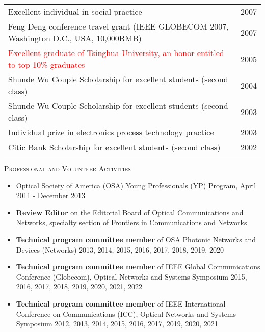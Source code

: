 \documentclass[letterpaper,11pt]{article}
\newcommand{\resheading}[1]{{\noindent\large \colorbox{mygrey}{
\begin{minipage}{1.0\textwidth}{\textsc{#1 \vphantom{p\^{E}}}}\end{minipage}}}}
\begin{document}
\begin{CJK}{UTF8}{gbsn}
\begin{tabular*}{7.08in}{l@{\extracolsep{\fill}}r}
Excellent individual in social practice & 2007\\
Feng Deng conference travel grant (IEEE GLOBECOM 2007, Washington D.C., USA, 10,000RMB) & 2007\\
\textcolor{Red}{Excellent graduate of Tsinghua University, an honor entitled to top 10\% graduates} & 2005\\
Shunde Wu Couple Scholarship for excellent students (second class) & 2004\\
Shunde Wu Couple Scholarship for excellent students (second class) & 2003\\
Individual prize in electronics process technology practice & 2003\\
Citic Bank Scholarship for excellent students (second class) & 2002\\
\end{tabular*}




\leftskip 0.0cm
\vspace{0.1in}
\resheading{Professional and Volunteer Activities}%
\begin{itemize}
\setlength{\itemindent}{-0.075in}


\item
Optical Society of America (OSA) Young Professionals (YP) Program, April 2011 - December 2013

\item
\textbf{Review Editor} on the Editorial Board of Optical Communications and Networks, specialty section of Frontiers in Communications and Networks

\item
\textbf{Technical program committee member} of OSA Photonic Networks and Devices (Networks) 2013, 2014, 2015, 2016, 2017, 2018, 2019, 2020

\item
\textbf{Technical program committee member} of IEEE Global Communications Conference (Globecom), Optical Networks and Systems Symposium 2015, 2016, 2017,
2018, 2019, 2020, 2021, 2022

\item
\textbf{Technical program committee member} of IEEE International Conference on Communications (ICC), Optical Networks and Systems Symposium
2012, 2013, 2014, 2015, 2016, 2017, 2019, 2020, 2021


\end{itemize}
\end{CJK}
\end{document}
